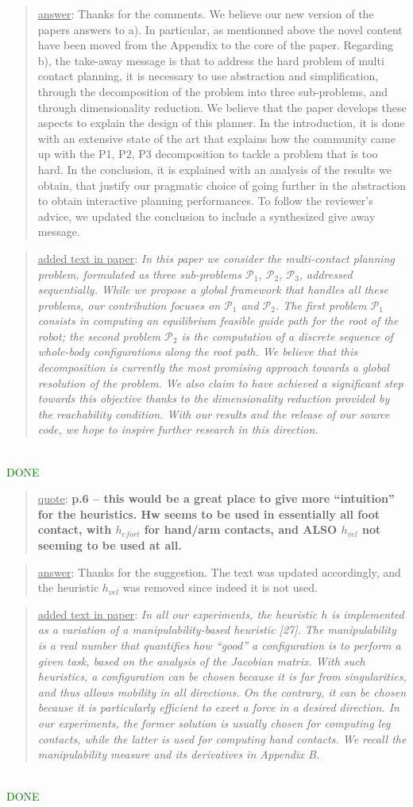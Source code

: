 \documentclass[a4paper]{article}
\newcommand{\gls}[1]{\textit{#1}}
\newcommand{\done}[0]{\textcolor{green}{DONE}}
\newcommand\quot[1]{\begin{quote} \underline{quote}: \textbf{#1}\end{quote}}
\newcommand\as[1]{\begin{quote} \underline{answer}: {#1}\end{quote} }
\newcommand\qt[1]{\begin{quote} \underline{added text in paper}: \textit{#1}\end{quote} \leavevmode \\ }
\begin{document}
\as{Thanks for the comments. We believe our new version of the papers answers to a). In particular, as mentionned above the novel content have been moved from the Appendix
to the core of the paper. Regarding b), the take-away message is that to address the hard problem of multi contact planning, it is necessary to use 
abstraction and simplification, through the decomposition of the problem into three sub-problems, and through dimensionality reduction.
We believe that the paper develops these aspects to explain the design of this planner. In the introduction, it is done
with an extensive state of the art that explains how the community came up with the P1, P2, P3 decomposition to tackle a problem that is too hard. In the conclusion, it is explained 
with an analysis of the results we obtain, that justify our pragmatic choice of going further in the abstraction to obtain interactive planning performances. To follow the reviewer's advice, we updated the conclusion
to include a synthesized give away message.}
\qt{In this paper we consider the multi-contact planning problem, formulated as three sub-problems  $\mathcal{P}_1$,  $\mathcal{P}_2$,  $\mathcal{P}_3$, addressed sequentially. While we propose a global framework that handles all these problems, our contribution focuses on  $\mathcal{P}_1$ and  $\mathcal{P}_2$.
The first problem $\mathcal{P}_1$ consists in computing an \gls{equilibrium feasible} guide path for the root of the robot;
the second problem $\mathcal{P}_2$ is the computation of a discrete sequence of whole-body configurations along the root path.
We believe that this decomposition is currently the most promising approach towards
a global resolution of the problem. We also claim to have achieved a significant step towards this objective thanks to the dimensionality reduction provided by
the reachability condition. With our results and the release of our source code, we hope to inspire further research in this direction.}\done

\quot{
p.6 – this would be a great place to give more ``intuition'' for the heuristics. Hw seems to be used in essentially all foot contact, with $h_{efort}$ for hand/arm contacts, and ALSO $h_{vel}$ not seeming to be used at all.}
\as{Thanks for the suggestion. The text was updated accordingly, and the heuristic $h_{vel}$ was removed since indeed it is not used.} 
\qt{In all our experiments, the heuristic $h$ is implemented as a variation of a manipulability-based heuristic [27]. The manipulability is a real number that quantifies how 
``good'' a configuration is to perform a given task, based on the analysis of the Jacobian matrix. With such heuristics, a configuration can be chosen because it is far from singularities, and thus allows mobility in all directions. On the contrary, it can be chosen because it is particularly efficient to exert a force in a desired direction. In our experiments, the former solution is usually chosen for computing leg contacts, while the latter is used for computing hand contacts. We recall the manipulability measure and its derivatives in Appendix B.}\done
\end{document}
